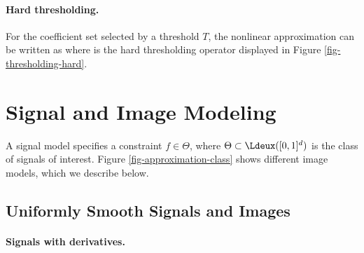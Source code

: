   
\paragraph{Hard thresholding.}
 
For the coefficient set selected by a threshold $T$, the nonlinear approximation can be written as
where 
is the hard thresholding operator displayed in Figure \ref{fig-thresholding-hard}.




                                           
                                           
                                           
\section{Signal and Image Modeling}
\label{sec-signal-models}

A signal model specifies a constraint $f \in \Theta$, where $\Theta \subset \Ldeux([0,1]^d)$ is the class of signals of interest.
Figure \ref{fig-approximation-class} shows different image models, which we describe below.




                                           
\subsection{Uniformly Smooth Signals and Images}
\label{subsec-smooth-class}

  
\paragraph{Signals with derivatives.}

